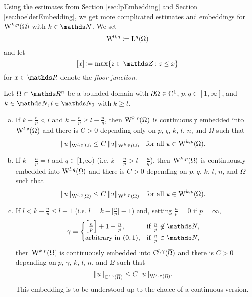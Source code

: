 Using the estimates from Section \ref{sec:lpEmbedding} and Section \ref{sec:hoelderEmbedding}, we get more complicated estimates and embeddings for $\mathrm{W}^{k,p}(\Omega)$ with $k \in \N$.
We set
$$
\mathrm{W}^{0,q} \coloneqq \mathrm{L}^q(\Omega)
$$
and let
$$
[x] \coloneqq \max \{ z \in \Z \colon z \leq x\}
$$
for $x \in \R$ denote the \emph{floor function}.

\begin{thm}
  \label{thm:generalEmbedding}
  Let $\Omega \subset \R^n$ be a bounded domain with $\partial\Omega \in \mathrm{C}^1$, $p,q \in [1,\infty]$, and $k \in \N, l \in \N_0$ with $k \geq l$.
  \begin{enumerate}[a)]
    \item If $k - \frac{n}{p} < l$ and $k - \frac{n}{p} \geq l - \frac{n}{q}$, then $\mathrm{W}^{k,p}(\Omega)$ is continuously embedded into $\mathrm{W}^{l,q}(\Omega)$ and there is $C > 0$ depending only on $p$, $q$, $k$, $l$, $n$, and $\Omega$ such that
      $$
      \|u\|_{\mathrm{W}^{l,q}(\Omega)} \leq C \, \|u\|_{\mathrm{W}^{k,p}(\Omega)} \quad\text{for all } u \in \mathrm{W}^{k,p}(\Omega).
      $$

    \item If $k - \frac{n}{p} = l$ and $q \in [1,\infty)$ (i.e. $k - \frac{n}{p} > l - \frac{n}{q}$), then $\mathrm{W}^{k,p}(\Omega)$ is continuously embedded into $\mathrm{W}^{l,q}(\Omega)$ and there is $C > 0$ depending on $p$, $q$, $k$, $l$, $n$, and $\Omega$ such that
      $$
      \|u\|_{\mathrm{W}^{l,q}(\Omega)} \leq C \, \|u\|_{\mathrm{W}^{k,p}(\Omega)} \quad\text{for all } u \in \mathrm{W}^{k,p}(\Omega).
      $$

    \item If $l < k - \frac{n}{p} \leq l + 1$ (i.e. $l = k - \Big[\frac{n}{p}\Big] - 1$) and, setting $\frac{n}{p} = 0$ if $p = \infty$,
      $$
      \gamma = \begin{cases} \Big[ \frac{n}{p} \Big] + 1 - \frac{n}{p}, &\text{if } \frac{n}{p} \not \in \N, \\ \text{arbitrary in }(0,1), &\text{if } \frac{n}{p} \in \N, \end{cases}
      $$
      then $\mathrm{W}^{k,p}(\Omega)$ is continuously embedded into $\mathrm{C}^{l,\gamma}(\overline\Omega)$ and there is $C > 0$ depending on $p$, $\gamma$, $k$, $l$, $n$, and $\Omega$ such that
      $$
      \| u\|_{\mathrm{C}^{l,\gamma}(\overline\Omega)} \leq C \, \|u\|_{\mathrm{W}^{k,p}(\Omega)}.
      $$
      This embedding is to be understood up to the choice of a continuous version.
  \end{enumerate}
\end{thm}

